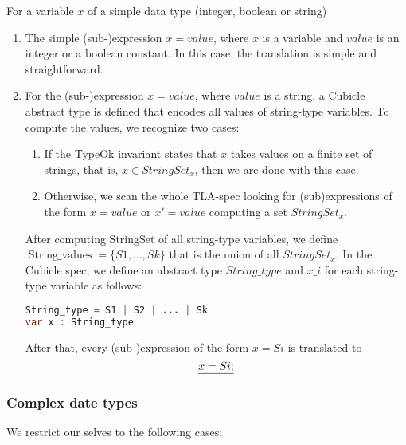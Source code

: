 \documentclass{article}
\theoremstyle{plain}
\numberwithin{equation}{section}
\begin{document}
 For a variable $x$ of a simple data type (integer, boolean or string) 
\begin{enumerate} 

\item The simple (sub-)expression \emph{$x=value$}, where $x$ is a variable and  \emph{$value$} is an integer or a boolean constant. In this case, the translation is simple and straightforward.  

\item  For  the (sub-)expression \emph{$x=value$}, where \emph{$value$} is a string, a Cubicle abstract type  is defined that encodes all values of string-type variables. To compute the values, we recognize two cases: 
\begin{enumerate}
\item If the TypeOk invariant states that  $x$ takes values on a finite set of strings, that is, \emph{$x \in StringSet_x$}, then we are done with this case.



\item Otherwise, we scan the whole TLA-spec looking for (sub)expressions of the form \emph{$x=value$} or \emph{$x'=value$} computing a set \emph{$StringSet_x$}.

  \end{enumerate}


After computing StringSet of all string-type variables, we define $\operatorname{String\_values}=\{S1,\dots, Sk\}$ that is the union of all \emph{$StringSet_x$}. In the Cubicle spec, we define an abstract type \emph{$String\_type$} and \emph{$x\_i$} for each string-type variable as follows: 

\begin{lstlisting}[language=Java]
String_type = S1 | S2 | ... | Sk
var x : String_type

\end{lstlisting}
After that, every (sub-)expression of the form \emph{$x=Si$} is translated to 
$$\emph{x= Si;}$$ 


\end{enumerate}



\subsubsection{Complex date types}
We restrict our selves to the following cases: 
\end{document}
